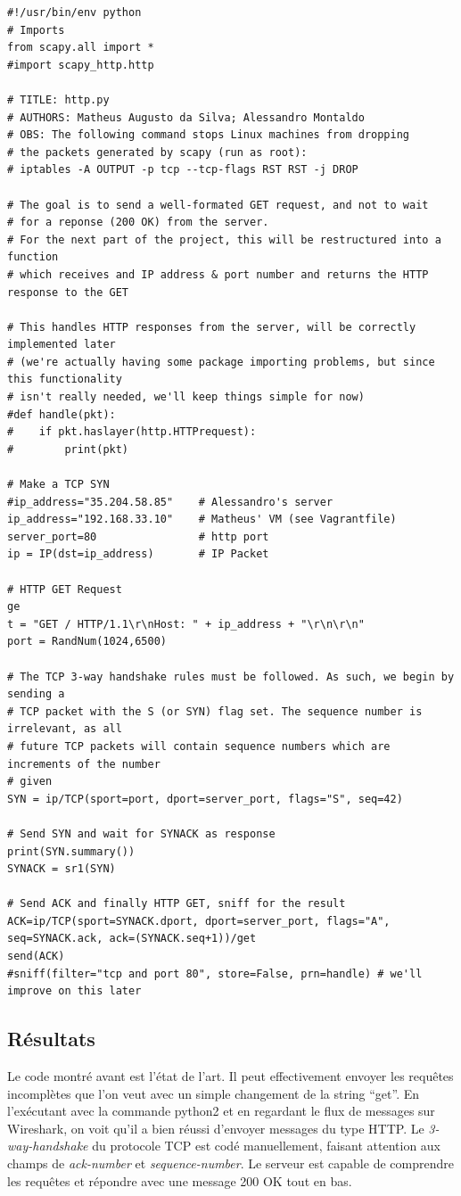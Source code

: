 \documentclass{article}
\begin{document}
\newpage
\begin{lstlisting}
#!/usr/bin/env python
# Imports
from scapy.all import *
#import scapy_http.http

# TITLE: http.py
# AUTHORS: Matheus Augusto da Silva; Alessandro Montaldo
# OBS: The following command stops Linux machines from dropping
# the packets generated by scapy (run as root):
# iptables -A OUTPUT -p tcp --tcp-flags RST RST -j DROP

# The goal is to send a well-formated GET request, and not to wait
# for a reponse (200 OK) from the server.
# For the next part of the project, this will be restructured into a function
# which receives and IP address & port number and returns the HTTP response to the GET

# This handles HTTP responses from the server, will be correctly implemented later
# (we're actually having some package importing problems, but since this functionality
# isn't really needed, we'll keep things simple for now)
#def handle(pkt):
#    if pkt.haslayer(http.HTTPrequest):
#        print(pkt)
    
# Make a TCP SYN
#ip_address="35.204.58.85"    # Alessandro's server
ip_address="192.168.33.10"    # Matheus' VM (see Vagrantfile)
server_port=80                # http port
ip = IP(dst=ip_address)       # IP Packet 

# HTTP GET Request
ge
t = "GET / HTTP/1.1\r\nHost: " + ip_address + "\r\n\r\n"
port = RandNum(1024,6500)

# The TCP 3-way handshake rules must be followed. As such, we begin by sending a
# TCP packet with the S (or SYN) flag set. The sequence number is irrelevant, as all
# future TCP packets will contain sequence numbers which are increments of the number
# given
SYN = ip/TCP(sport=port, dport=server_port, flags="S", seq=42) 

# Send SYN and wait for SYNACK as response
print(SYN.summary())
SYNACK = sr1(SYN)

# Send ACK and finally HTTP GET, sniff for the result
ACK=ip/TCP(sport=SYNACK.dport, dport=server_port, flags="A", seq=SYNACK.ack, ack=(SYNACK.seq+1))/get
send(ACK)
#sniff(filter="tcp and port 80", store=False, prn=handle) # we'll improve on this later 
\end{lstlisting}

\newpage

\subsection{Résultats}
Le code montré avant est l'état de l'art. Il peut effectivement envoyer les requêtes incomplètes que l'on veut
avec un simple changement de la string ``get''. En l’exécutant avec la commande python2 et en regardant 
le flux de messages sur Wireshark, on voit qu'il a bien réussi d'envoyer messages du type HTTP. Le
\textit{3-way-handshake} du protocole TCP est codé manuellement, faisant attention aux champs de
\textit{ack-number} et \textit{sequence-number}. Le serveur est capable de comprendre les requêtes et
répondre avec une message 200 OK tout en bas.
\end{document}
